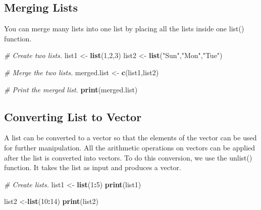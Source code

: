 \documentclass[]{book}
\newenvironment{Shaded}{\begin{snugshade}}{\end{snugshade}}
\newcommand{\CommentTok}[1]{\textcolor[rgb]{0.56,0.35,0.01}{\textit{#1}}}
\newcommand{\DecValTok}[1]{\textcolor[rgb]{0.00,0.00,0.81}{#1}}
\newcommand{\KeywordTok}[1]{\textcolor[rgb]{0.13,0.29,0.53}{\textbf{#1}}}
\newcommand{\NormalTok}[1]{#1}
\newcommand{\OperatorTok}[1]{\textcolor[rgb]{0.81,0.36,0.00}{\textbf{#1}}}
\newcommand{\StringTok}[1]{\textcolor[rgb]{0.31,0.60,0.02}{#1}}
\theoremstyle{definition}
\theoremstyle{definition}
\theoremstyle{definition}
\theoremstyle{remark}
\begin{document}
\hypertarget{merging-lists}{%
\subsection{Merging Lists}\label{merging-lists}}

You can merge many lists into one list by placing all the lists inside
one list() function.

\begin{Shaded}
\begin{Highlighting}[]
\CommentTok{# Create two lists.}
\NormalTok{list1 <-}\StringTok{ }\KeywordTok{list}\NormalTok{(}\DecValTok{1}\NormalTok{,}\DecValTok{2}\NormalTok{,}\DecValTok{3}\NormalTok{)}
\NormalTok{list2 <-}\StringTok{ }\KeywordTok{list}\NormalTok{(}\StringTok{"Sun"}\NormalTok{,}\StringTok{"Mon"}\NormalTok{,}\StringTok{"Tue"}\NormalTok{)}

\CommentTok{# Merge the two lists.}
\NormalTok{merged.list <-}\StringTok{ }\KeywordTok{c}\NormalTok{(list1,list2)}

\CommentTok{# Print the merged list.}
\KeywordTok{print}\NormalTok{(merged.list)}
\end{Highlighting}
\end{Shaded}

\hypertarget{converting-list-to-vector}{%
\subsection{Converting List to Vector}\label{converting-list-to-vector}}

A list can be converted to a vector so that the elements of the vector
can be used for further manipulation. All the arithmetic operations on
vectors can be applied after the list is converted into vectors. To do
this conversion, we use the unlist() function. It takes the list as
input and produces a vector.

\begin{Shaded}
\begin{Highlighting}[]
\CommentTok{# Create lists.}
\NormalTok{list1 <-}\StringTok{ }\KeywordTok{list}\NormalTok{(}\DecValTok{1}\OperatorTok{:}\DecValTok{5}\NormalTok{)}
\KeywordTok{print}\NormalTok{(list1)}
\end{Highlighting}
\end{Shaded}

\begin{Shaded}
\begin{Highlighting}[]
\NormalTok{list2 <-}\KeywordTok{list}\NormalTok{(}\DecValTok{10}\OperatorTok{:}\DecValTok{14}\NormalTok{)}
\KeywordTok{print}\NormalTok{(list2)}
\end{Highlighting}
\end{Shaded}
\end{document}
